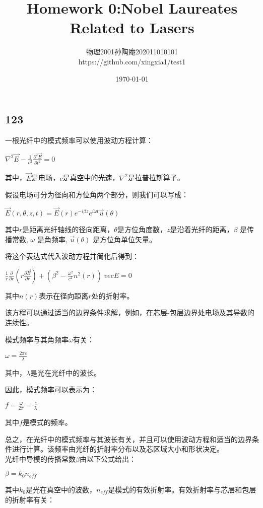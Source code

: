 \documentclass[12pt, a4paper, oneside]{ctexart}
\title{Homework 0:Nobel Laureates Related to Lasers}
\date{\today}
\author{物理2001孙陶庵202011010101\\https://github.com/xingxia1/test1}
\begin{document}
\begin{spacing}{2.0}
\maketitle

\section{123}
一根光纤中的模式频率可以使用波动方程计算：

$\nabla^2\vec{E}-\frac{1}{c^2}\frac{\partial^2\vec{E}}{\partial t^2} = 0$

其中，$\vec{E}$是电场，$c$是真空中的光速，$\nabla^2$是拉普拉斯算子。

假设电场可分为径向和方位角两个部分，则我们可以写成：

$\vec{E}(r,\theta,z,t)=\vec{E}(r)e^{-i\beta z}e^{i\omega t}\vec{u}(\theta)$

其中$r$是距离光纤轴线的径向距离，$\theta$是方位角度数，$z$是沿着光纤的距离，$\beta$ 是传播常数, $\omega $ 是角频率, $\vec {u } (\theta ) $ 是方位角单位矢量。

将这个表达式代入波动方程并简化后得到：

$
    \frac {1}{r}\frac {\partial }{\partial r}\left(r \frac {\partial \vec {E}}{\partial r }\right)+(\beta ^ 2-\frac {\omega ^ 2}{c ^ 2} n ^ 2 (r)) \ vec { E}=0
$

其中$n(r)$表示在径向距离$r $处的折射率。

该方程可以通过适当的边界条件求解，例如，在芯层-包层边界处电场及其导数的连续性。

模式频率与其角频率$\omega$有关：

$
    \omega =\frac {2\pi c}{\lambda}
$

其中，$\lambda $是光在光纤中的波长。

因此，模式频率可以表示为：

$
    f=\frac {\omega }{2\pi}=\frac {c}{\lambda}
$

其中$f$是模式的频率。

总之，在光纤中的模式频率与其波长有关，并且可以使用波动方程和适当的边界条件进行计算。该频率由光纤的折射率分布以及芯区域大小和形状决定。\\

光纤中导模的传播常数$\beta$由以下公式给出：

$\beta = k_0 n_{eff}$

其中$k_0$是光在真空中的波数，$n_{eff}$是模式的有效折射率。有效折射率与芯层和包层的折射率有关：


\end{spacing}
\end{document}

